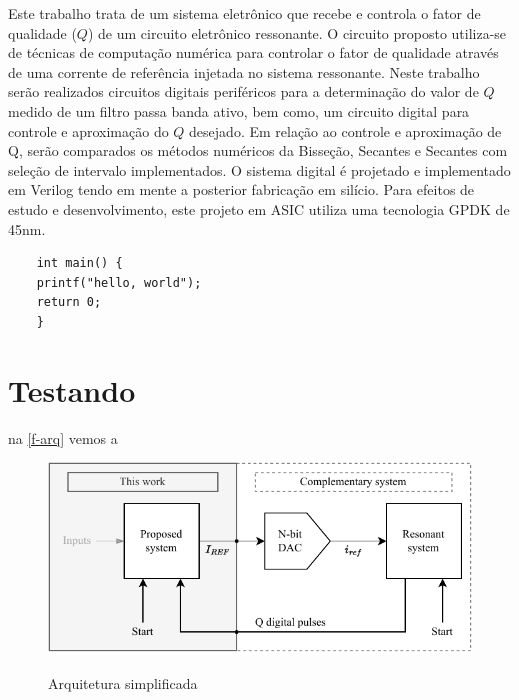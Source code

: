 % 

Este trabalho trata de um sistema eletrônico que recebe e controla o fator de qualidade ($Q$) de um circuito eletrônico ressonante. O circuito proposto utiliza-se de técnicas de computação numérica para controlar o fator de qualidade através de uma corrente de referência injetada no sistema ressonante. Neste trabalho serão realizados circuitos digitais periféricos para a determinação do valor de $Q$ medido de um filtro passa banda ativo, bem como, um circuito digital para controle e aproximação do $Q$ desejado. Em relação ao controle e aproximação de Q, serão comparados os métodos numéricos da Bisseção, Secantes e Secantes com seleção de intervalo implementados. O sistema digital é projetado e implementado em Verilog tendo em mente a posterior fabricação em silício. Para efeitos de estudo e desenvolvimento, este projeto em ASIC utiliza uma tecnologia GPDK de 45nm.

\begin{verbatim}
    int main() {
    printf("hello, world");
    return 0;
    }
\end{verbatim}

\chapter{Testando}


na \autoref{f-arq} vemos a 

\begin{figure}[H]
	\centering
	\caption{Arquitetura simplificada}
	\includegraphics[width=\columnwidth]{"./fig/arq-simplif.pdf"}
	\label{f-arq}
\end{figure}


\postextual




